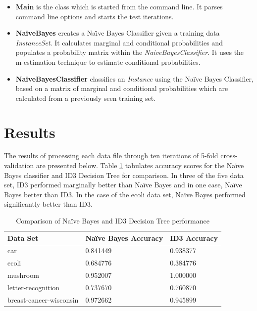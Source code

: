 \documentclass[10pt]{report}
\begin{document}
\begin{itemize}
\item \textbf{Main} is the class which is started from the command
  line. It parses command line options and starts the test iterations.

\item \textbf{NaiveBayes} creates a Na\"{\i}ve Bayes Classifier
  given a training data \textit{InstanceSet}. It calculates marginal
  and conditional probabilities and populates a probability matrix
  within the \textit{NaiveBayesClassifier}. It uses the m-estimation
  technique to estimate conditional probabilities.

\item \textbf{NaiveBayesClassifier} classifies an \textit{Instance}
  using the Na\"{i}ve Bayes Classifier, based on a matrix of
  marginal and conditional probabilities which are calculated from a
  previously seen training set.

\end{itemize}


\section{Results}
\label{sec:results}
The results of processing each data file through ten iterations of
5-fold cross-validation are presented below. Table
\ref{tab:comparison} tabulates accuracy scores for the Na\"{i}ve Bayes
classifier and ID3 Decision Tree for comparison. In three of the five
data set, ID3 performed marginally better than Na\"{i}ve Bayes and in
one case, Na\"{i}ve Bayes better than ID3. In the case of the ecoli
data set, Na\"{i}ve Bayes performed significantly better than ID3.

\begin{table}[h]
  \centering
  \begin{tabular}{ |l|l|l|} 
    \hline
    \textbf{Data Set} & \textbf{Na\"{i}ve Bayes Accuracy} & \textbf{ID3 Accuracy} \\ \hline
    car                      &  0.841449  &  0.938377 \\ \hline
    ecoli                    &  0.684776  &  0.384776 \\ \hline
    mushroom                 &  0.952007  &  1.000000 \\ \hline
    letter-recognition       &  0.737670  &  0.760870 \\ \hline
    breast-cancer-wisconsin  &  0.972662  &  0.945899 \\ \hline
  \end{tabular}
  \caption{Comparison of Na\"{i}ve Bayes and ID3 Decision Tree performance}
  \label{tab:comparison}
\end{table}
\end{document}
